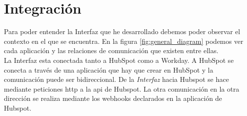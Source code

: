 









\chapter{Integración}

Para poder entender la Interfaz que he desarrollado debemos poder observar el contexto en el que se encuentra. En la figura \ref{fig:general_diagram} podemos ver cada aplicación y las relaciones de comunicación que existen entre ellas.\\



La Interfaz esta conectada tanto a HubSpot como a Workday. A HubSpot se conecta a través de una aplicación que hay que crear en HubSpot y la comunicación  puede ser bidireccional. De la \textit{Interfaz} hacia Hubspot se hace mediante peticiones \acrshort{http} a la \acrshort{api} de Hubspot. La otra comunicación en la otra dirección se realiza mediante los webhooks declarados en la aplicación de Hubspot.\\

